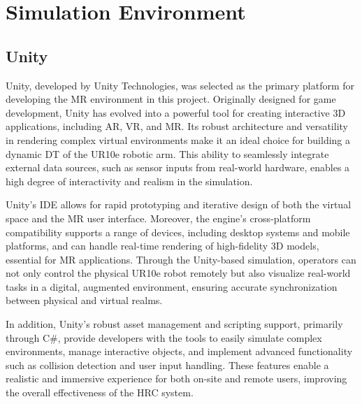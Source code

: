 \section{Simulation Environment}

\subsection{Unity}

Unity, developed by Unity Technologies, was selected as the primary platform for developing the \ac{MR} environment in this project. Originally designed for game development, Unity has evolved into a powerful tool for creating interactive 3D applications, including \ac{AR}, \ac{VR}, and \ac{MR}. Its robust architecture and versatility in rendering complex virtual environments make it an ideal choice for building a dynamic \ac{DT} of the UR10e robotic arm. This ability to seamlessly integrate external data sources, such as sensor inputs from real-world hardware, enables a high degree of interactivity and realism in the simulation.

Unity’s \ac{IDE} allows for rapid prototyping and iterative design of both the virtual space and the \ac{MR} user interface. Moreover, the engine's cross-platform compatibility supports a range of devices, including desktop systems and mobile platforms, and can handle real-time rendering of high-fidelity 3D models, essential for \ac{MR} applications. Through the Unity-based simulation, operators can not only control the physical UR10e robot remotely but also visualize real-world tasks in a digital, augmented environment, ensuring accurate synchronization between physical and virtual realms.

In addition, Unity’s robust asset management and scripting support, primarily through C\#, provide developers with the tools to easily simulate complex environments, manage interactive objects, and implement advanced functionality such as collision detection and user input handling. These features enable a realistic and immersive experience for both on-site and remote users, improving the overall effectiveness of the \ac{HRC} system.




